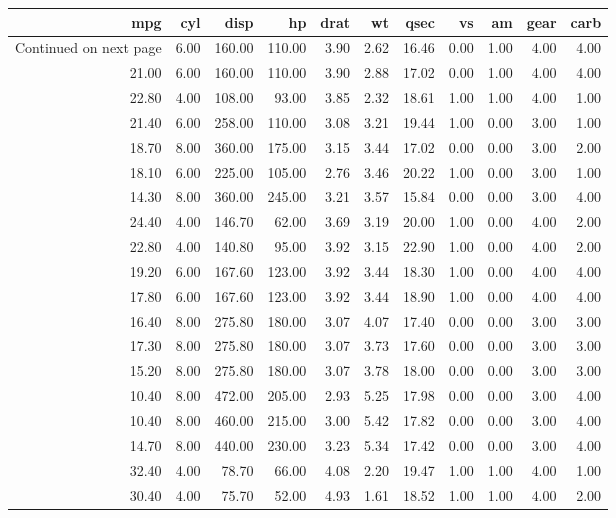 \documentclass[11pt,preprint, authoryear]{elsarticle}
\numberwithin{equation}{section}
\numberwithin{figure}{section}
\numberwithin{table}{section}
\begin{document}
\begin{longtable}{rrrrrrrrrrr}
  \toprule
mpg & cyl & disp & hp & drat & wt & qsec & vs & am & gear & carb \\ 
  \hline 
\endhead 
\hline 
{\footnotesize Continued on next page} 
\endfoot 
\endlastfoot 
 \midrule
21.00 & 6.00 & 160.00 & 110.00 & 3.90 & 2.62 & 16.46 & 0.00 & 1.00 & 4.00 & 4.00 \\ 
  21.00 & 6.00 & 160.00 & 110.00 & 3.90 & 2.88 & 17.02 & 0.00 & 1.00 & 4.00 & 4.00 \\ 
  22.80 & 4.00 & 108.00 & 93.00 & 3.85 & 2.32 & 18.61 & 1.00 & 1.00 & 4.00 & 1.00 \\ 
  21.40 & 6.00 & 258.00 & 110.00 & 3.08 & 3.21 & 19.44 & 1.00 & 0.00 & 3.00 & 1.00 \\ 
  18.70 & 8.00 & 360.00 & 175.00 & 3.15 & 3.44 & 17.02 & 0.00 & 0.00 & 3.00 & 2.00 \\ 
  18.10 & 6.00 & 225.00 & 105.00 & 2.76 & 3.46 & 20.22 & 1.00 & 0.00 & 3.00 & 1.00 \\ 
  14.30 & 8.00 & 360.00 & 245.00 & 3.21 & 3.57 & 15.84 & 0.00 & 0.00 & 3.00 & 4.00 \\ 
  24.40 & 4.00 & 146.70 & 62.00 & 3.69 & 3.19 & 20.00 & 1.00 & 0.00 & 4.00 & 2.00 \\ 
  22.80 & 4.00 & 140.80 & 95.00 & 3.92 & 3.15 & 22.90 & 1.00 & 0.00 & 4.00 & 2.00 \\ 
  19.20 & 6.00 & 167.60 & 123.00 & 3.92 & 3.44 & 18.30 & 1.00 & 0.00 & 4.00 & 4.00 \\ 
  17.80 & 6.00 & 167.60 & 123.00 & 3.92 & 3.44 & 18.90 & 1.00 & 0.00 & 4.00 & 4.00 \\ 
  16.40 & 8.00 & 275.80 & 180.00 & 3.07 & 4.07 & 17.40 & 0.00 & 0.00 & 3.00 & 3.00 \\ 
  17.30 & 8.00 & 275.80 & 180.00 & 3.07 & 3.73 & 17.60 & 0.00 & 0.00 & 3.00 & 3.00 \\ 
  15.20 & 8.00 & 275.80 & 180.00 & 3.07 & 3.78 & 18.00 & 0.00 & 0.00 & 3.00 & 3.00 \\ 
  10.40 & 8.00 & 472.00 & 205.00 & 2.93 & 5.25 & 17.98 & 0.00 & 0.00 & 3.00 & 4.00 \\ 
  10.40 & 8.00 & 460.00 & 215.00 & 3.00 & 5.42 & 17.82 & 0.00 & 0.00 & 3.00 & 4.00 \\ 
  14.70 & 8.00 & 440.00 & 230.00 & 3.23 & 5.34 & 17.42 & 0.00 & 0.00 & 3.00 & 4.00 \\ 
  32.40 & 4.00 & 78.70 & 66.00 & 4.08 & 2.20 & 19.47 & 1.00 & 1.00 & 4.00 & 1.00 \\ 
  30.40 & 4.00 & 75.70 & 52.00 & 4.93 & 1.61 & 18.52 & 1.00 & 1.00 & 4.00 & 2.00 \\ 

\end{longtable}
\end{document}
